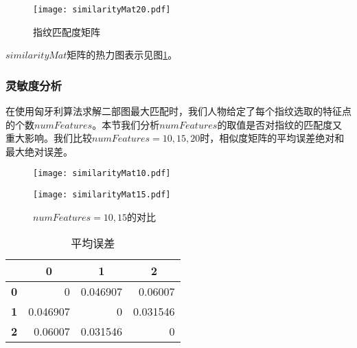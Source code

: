 \documentclass[withoutpreface,bwprint]{cumcmthesis} %
\begin{document}
  \begin{figure}[!h]
	  \centering
	  \texttt{[image: similarityMat20.pdf]}
	  \caption{指纹匹配度矩阵}
	  \label{fig:similarityMat}
  \end{figure}
  $similarityMat$矩阵的热力图表示见图\ref{fig:similarityMat}。


\subsubsection{灵敏度分析}
在使用匈牙利算法求解二部图最大匹配时，我们人物给定了每个指纹选取的特征点的个数$numFeatures$。本节我们分析$numFeatures$的取值是否对指纹的匹配度又重大影响。我们比较$numFeatures=10,15,20$时，相似度矩阵的平均误差绝对和最大绝对误差。

\begin{figure}[!h]
    \centering
    \begin{minipage}[c]{0.45\textwidth}
        \centering
        \texttt{[image: similarityMat10.pdf]}
        \label{fig:similarityMat10}
    \end{minipage}
    \begin{minipage}[c]{0.45\textwidth}
        \centering
        \texttt{[image: similarityMat15.pdf]}
        \label{fig:similarityMat15}
    \end{minipage}
	\caption{$numFeatures=10,15$的对比}
  \end{figure}
\begin{table}[h!]
	\centering
	\caption{平均误差}
	  \begin{tabular}{crrr}
	  \toprule
			& \multicolumn{1}{c}{\textbf{0}} & \multicolumn{1}{c}{\textbf{1}} & \multicolumn{1}{c}{\textbf{2}} \\
	  \midrule
	  \textbf{0} & 0     & 0.046907 & 0.06007 \\
	  \textbf{1} & 0.046907 & 0     & 0.031546 \\
	  \textbf{2} & 0.06007 & 0.031546 & 0 \\
	  \bottomrule
	  \end{tabular}%
	\label{tab:avgErr}%
  \end{table}%
\end{document}
